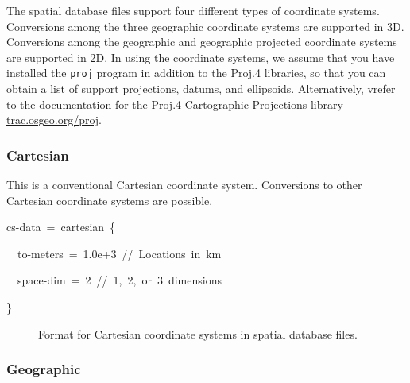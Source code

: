 The spatial database files support four different types of coordinate
systems. Conversions among the three geographic coordinate systems
are supported in 3D. Conversions among the geographic and geographic
projected coordinate systems are supported in 2D. In using the coordinate
systems, we assume that you have installed the \texttt{proj} program
in addition to the Proj.4 libraries, so that you can obtain a list
of support projections, datums, and ellipsoids. Alternatively, vrefer
to the documentation for the Proj.4 Cartographic Projections library
\url{trac.osgeo.org/proj}.


\subsubsection{Cartesian}

This is a conventional Cartesian coordinate system. Conversions to
other Cartesian coordinate systems are possible.
\begin{lyxcode}
cs-data~=~cartesian~\{

~~to-meters~=~1.0e+3~//~Locations~in~km

~~space-dim~=~2~//~1,~2,~or~3~dimensions

\}
\end{lyxcode}
\begin{figure}[H]
\caption{Format for Cartesian coordinate systems in spatial database files.}
\end{figure}



\subsubsection{Geographic}

